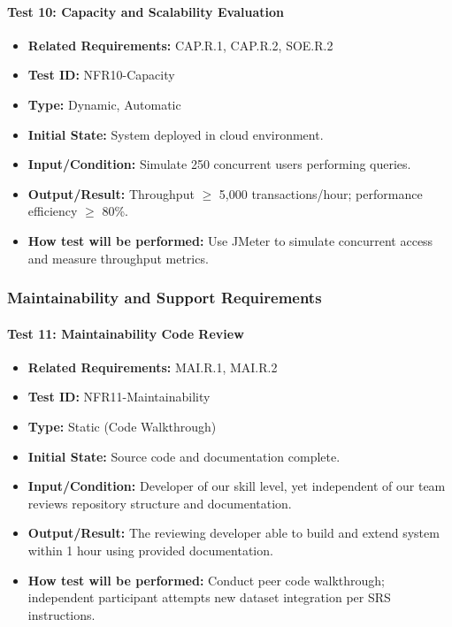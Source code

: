 \documentclass[12pt, titlepage]{article}
\begin{document}
\paragraph{Test 10: Capacity and Scalability Evaluation}
\begin{itemize}
    \item \textbf{Related Requirements:} CAP.R.1, CAP.R.2, SOE.R.2
    \item \textbf{Test ID:} NFR10-Capacity
    \item \textbf{Type:} Dynamic, Automatic
    \item \textbf{Initial State:} System deployed in cloud environment.
    \item \textbf{Input/Condition:} Simulate 250 concurrent users performing queries.
    \item \textbf{Output/Result:} Throughput $\geq$ 5,000 transactions/hour; performance efficiency $\geq$ 80\%.
    \item \textbf{How test will be performed:} Use JMeter to simulate concurrent access and measure throughput metrics.
\end{itemize}

\subsubsection{Maintainability and Support Requirements}

\paragraph{Test 11: Maintainability Code Review}
\begin{itemize}
    \item \textbf{Related Requirements:} MAI.R.1, MAI.R.2
    \item \textbf{Test ID:} NFR11-Maintainability
    \item \textbf{Type:} Static (Code Walkthrough)
    \item \textbf{Initial State:} Source code and documentation complete.
    \item \textbf{Input/Condition:} Developer of our skill level, yet independent of our team reviews repository structure and documentation.
    \item \textbf{Output/Result:} The reviewing developer able to build and extend system within 1 hour using provided documentation.
    \item \textbf{How test will be performed:} Conduct peer code walkthrough; independent participant attempts new dataset integration per SRS instructions.
\end{itemize}
\end{document}
